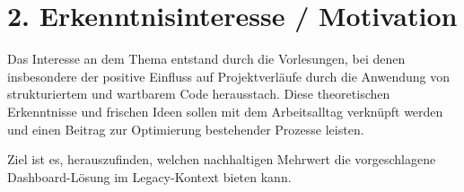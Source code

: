 \section*{2. Erkenntnisinteresse / Motivation}
Das Interesse an dem Thema entstand durch die Vorlesungen, bei denen insbesondere der positive Einfluss auf Projektverläufe durch die Anwendung von strukturiertem und wartbarem Code herausstach. Diese theoretischen Erkenntnisse und frischen Ideen sollen mit dem Arbeitsalltag verknüpft werden und einen Beitrag zur Optimierung bestehender Prozesse leisten.

Ziel ist es, herauszufinden, welchen nachhaltigen Mehrwert die vorgeschlagene Dashboard-Lösung im Legacy-Kontext bieten kann.
